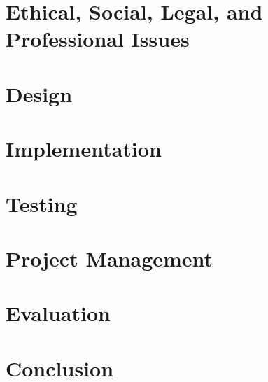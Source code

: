 \documentclass[
  12pt,
  a4paper,
  twoside,
  onecolumn,
  appendixprefix=true,
  toc=chapterentrywithdots,
  toc=bibliography,
  abstract=true,
  toc=listof
]{scrreprt}
\begin{document}
\chapter{Ethical, Social, Legal, and Professional Issues}
\label{issues}


\chapter{Design}
\label{design}


\chapter{Implementation}
\label{implementation}


\chapter{Testing}
\label{testing}


\chapter{Project Management}
\label{project_management}


\chapter{Evaluation}
\label{evaluation}


\chapter{Conclusion}
\label{conclusion}






\appendix
\newpage
{}

\end{document}
